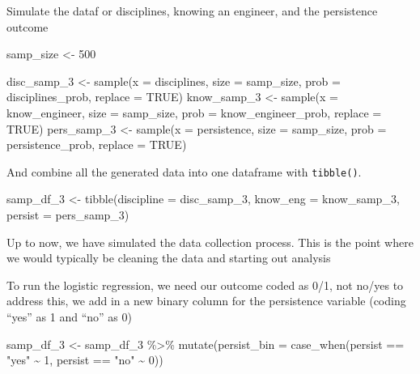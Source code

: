 \documentclass[
]{book}
\newenvironment{Shaded}{\begin{snugshade}}{\end{snugshade}}
\newcommand{\AttributeTok}[1]{\textcolor[rgb]{0.77,0.63,0.00}{#1}}
\newcommand{\ConstantTok}[1]{\textcolor[rgb]{0.00,0.00,0.00}{#1}}
\newcommand{\DecValTok}[1]{\textcolor[rgb]{0.00,0.00,0.81}{#1}}
\newcommand{\FunctionTok}[1]{\textcolor[rgb]{0.00,0.00,0.00}{#1}}
\newcommand{\NormalTok}[1]{#1}
\newcommand{\OtherTok}[1]{\textcolor[rgb]{0.56,0.35,0.01}{#1}}
\newcommand{\SpecialCharTok}[1]{\textcolor[rgb]{0.00,0.00,0.00}{#1}}
\newcommand{\StringTok}[1]{\textcolor[rgb]{0.31,0.60,0.02}{#1}}
\begin{document}
Simulate the dataf or disciplines, knowing an engineer, and the persistence outcome

\begin{Shaded}
\begin{Highlighting}[]
\NormalTok{samp\_size }\OtherTok{\textless{}{-}} \DecValTok{500}

\NormalTok{disc\_samp\_3 }\OtherTok{\textless{}{-}} \FunctionTok{sample}\NormalTok{(}\AttributeTok{x =}\NormalTok{ disciplines, }\AttributeTok{size =}\NormalTok{ samp\_size, }\AttributeTok{prob =}\NormalTok{ disciplines\_prob, }\AttributeTok{replace =} \ConstantTok{TRUE}\NormalTok{)}
\NormalTok{know\_samp\_3 }\OtherTok{\textless{}{-}} \FunctionTok{sample}\NormalTok{(}\AttributeTok{x =}\NormalTok{ know\_engineer, }\AttributeTok{size =}\NormalTok{ samp\_size, }\AttributeTok{prob =}\NormalTok{ know\_engineer\_prob, }\AttributeTok{replace =} \ConstantTok{TRUE}\NormalTok{)}
\NormalTok{pers\_samp\_3 }\OtherTok{\textless{}{-}} \FunctionTok{sample}\NormalTok{(}\AttributeTok{x =}\NormalTok{ persistence, }\AttributeTok{size =}\NormalTok{ samp\_size, }\AttributeTok{prob =}\NormalTok{ persistence\_prob, }\AttributeTok{replace =} \ConstantTok{TRUE}\NormalTok{)}
\end{Highlighting}
\end{Shaded}

And combine all the generated data into one dataframe with \texttt{tibble()}.

\begin{Shaded}
\begin{Highlighting}[]
\NormalTok{samp\_df\_3 }\OtherTok{\textless{}{-}} \FunctionTok{tibble}\NormalTok{(}\AttributeTok{discipline =}\NormalTok{ disc\_samp\_3,}
                  \AttributeTok{know\_eng =}\NormalTok{ know\_samp\_3,}
                  \AttributeTok{persist =}\NormalTok{ pers\_samp\_3)}
\end{Highlighting}
\end{Shaded}

Up to now, we have simulated the data collection process. This is the point where we would typically be cleaning the data and starting out analysis

To run the logistic regression, we need our outcome coded as 0/1, not no/yes to address this, we add in a new binary column for the persistence variable (coding ``yes'' as 1 and ``no'' as 0)

\begin{Shaded}
\begin{Highlighting}[]
\NormalTok{samp\_df\_3 }\OtherTok{\textless{}{-}}\NormalTok{ samp\_df\_3 }\SpecialCharTok{\%\textgreater{}\%} 
  \FunctionTok{mutate}\NormalTok{(}\AttributeTok{persist\_bin =} \FunctionTok{case\_when}\NormalTok{(persist }\SpecialCharTok{==} \StringTok{"yes"} \SpecialCharTok{\textasciitilde{}} \DecValTok{1}\NormalTok{,}
\NormalTok{                                 persist }\SpecialCharTok{==} \StringTok{"no"} \SpecialCharTok{\textasciitilde{}} \DecValTok{0}\NormalTok{))}
\end{Highlighting}
\end{Shaded}
\end{document}
